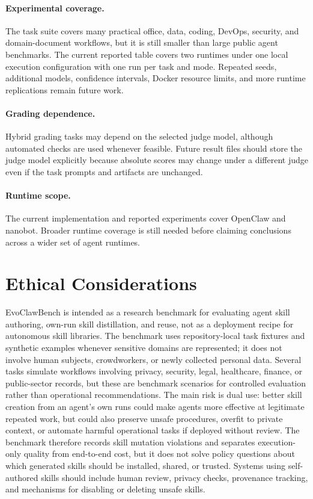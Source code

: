 \documentclass[11pt]{article}
\newcommand{\ours}{EvoClawBench}
\begin{document}
\paragraph{Experimental coverage.}
The task suite covers many practical office, data, coding, DevOps, security, and domain-document workflows, but it is still smaller than large public agent benchmarks.
The current reported table covers two runtimes under one local execution configuration with one run per task and mode.
Repeated seeds, additional models, confidence intervals, Docker resource limits, and more runtime replications remain future work.

\paragraph{Grading dependence.}
Hybrid grading tasks may depend on the selected judge model, although automated checks are used whenever feasible.
Future result files should store the judge model explicitly because absolute scores may change under a different judge even if the task prompts and artifacts are unchanged.

\paragraph{Runtime scope.}
The current implementation and reported experiments cover OpenClaw and nanobot.
Broader runtime coverage is still needed before claiming conclusions across a wider set of agent runtimes.

\section*{Ethical Considerations}

\ours{} is intended as a research benchmark for evaluating agent skill authoring, own-run skill distillation, and reuse, not as a deployment recipe for autonomous skill libraries.
The benchmark uses repository-local task fixtures and synthetic examples whenever sensitive domains are represented; it does not involve human subjects, crowdworkers, or newly collected personal data.
Several tasks simulate workflows involving privacy, security, legal, healthcare, finance, or public-sector records, but these are benchmark scenarios for controlled evaluation rather than operational recommendations. The main risk is dual use: better skill creation from an agent's own runs could make agents more effective at legitimate repeated work, but could also preserve unsafe procedures, overfit to private context, or automate harmful operational tasks if deployed without review.
The benchmark therefore records skill mutation violations and separates execution-only quality from end-to-end cost, but it does not solve policy questions about which generated skills should be installed, shared, or trusted.
Systems using self-authored skills should include human review, privacy checks, provenance tracking, and mechanisms for disabling or deleting unsafe skills.
\end{document}
